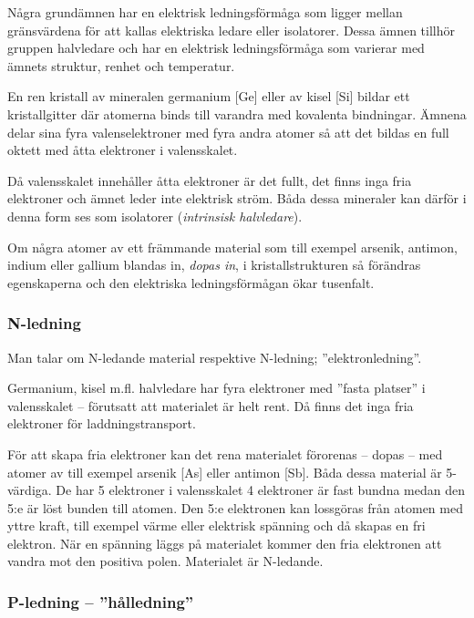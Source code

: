 Några grundämnen har en elektrisk ledningsförmåga som ligger mellan gränsvärdena
för att kallas elektriska ledare eller isolatorer.
Dessa ämnen tillhör gruppen halvledare och har en elektrisk ledningsförmåga som
varierar med ämnets struktur, renhet och temperatur.

En ren kristall av mineralen germanium [Ge] eller av kisel [Si] bildar ett
kristallgitter där atomerna binds till varandra med kovalenta bindningar.
Ämnena delar sina fyra valenselektroner med fyra andra atomer så att det
bildas en full oktett med åtta elektroner i valensskalet.

Då valensskalet innehåller åtta elektroner är det fullt, det finns inga fria
elektroner och ämnet leder inte elektrisk ström.
Båda dessa mineraler kan därför i denna form ses som isolatorer
(\emph{intrinsisk halvledare}).

Om några atomer av ett främmande material som till exempel arsenik, antimon,
indium eller gallium blandas in, \emph{dopas in}, i kristallstrukturen så
förändras egenskaperna och den elektriska ledningsförmågan ökar tusenfalt.

\subsubsection{N-ledning}

Man talar om N-ledande material respektive N-led\-ni\-ng; ''elektronled\-ni\-ng''.

Germanium, kisel m.fl. halvledare har fyra elektroner med ''fasta platser'' i
valensskalet -- förutsatt att materialet är helt rent.
Då finns det inga fria elektroner för laddningstransport.

För att skapa fria elektroner kan det rena materialet förorenas -- dopas -- med
atomer av till exempel arsenik [As] eller antimon [Sb].
Båda dessa material är 5-värdiga.
De har 5 elektroner i valensskalet 4 elektroner är fast bundna medan
den 5:e är löst bunden till atomen.
Den 5:e elektronen kan lossgöras från atomen med yttre kraft, till exempel värme
eller elektrisk spänning och då skapas en fri elektron.
När en spänning läggs på materialet kommer den fria elektronen att vandra mot
den positiva polen.
Materialet är N-ledande.

\subsubsection{P-ledning -- ''hålledning''}

